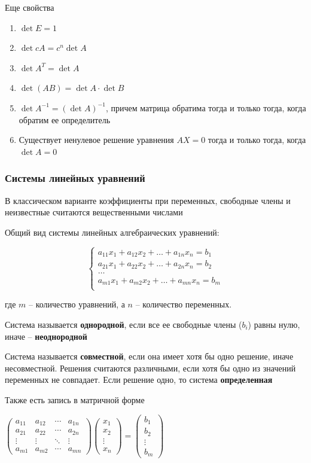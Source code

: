 \documentclass{article}
\begin{document}
Еще свойства

\begin{enumerate}
	\item $\det E = 1$
	\item $\det cA = c^n \det A$
	\item $\det A^T = \det A$
	\item $\det(AB) = \det A \cdot \det B$
	\item $\det A^{-1} = (\det A)^{-1}$, причем матрица обратима тогда и только тогда, когда обратим ее определитель
	\item Существует ненулевое решение уравнения $AX = 0$ тогда и только тогда, когда $\det A = 0$ 
\end{enumerate}

\subsubsection{Системы линейных уравнений}

В классическом варианте коэффициенты при переменных, свободные члены и неизвестные считаются вещественными числами

Общий вид системы линейных алгебраических уравнений:

$$
{\begin{cases}a_{11}x_{1}+a_{12}x_{2}+\dots +a_{1n}x_{n}=b_{1}\\a_{21}x_{1}+a_{22}x_{2}+\dots +a_{2n}x_{n}=b_{2}\\\dots \\a_{m1}x_{1}+a_{m2}x_{2}+\dots +a_{mn}x_{n}=b_{m}\\\end{cases}}$$

где $m$ -- количество уравнений, а $n$ -- количество переменных.

Система называется {\bf однородной}, если все ее свободные члены ($b_i$) равны нулю, иначе -- {\bf неоднородной}

Система называется {\bf совместной}, если она имеет хотя бы одно решение, иначе несовместной. Решения считаются различными, если хотя бы одно из значений переменных не совпадает. Если решение одно, то система {\bf определенная}

Также есть запись в матричной форме

$
\begin{pmatrix}
a_{11} & a_{12} & \cdots & a_{1n} \\
a_{21} & a_{22} & \cdots & a_{2n} \\
\vdots & \vdots & \ddots & \vdots \\
a_{m1} & a_{m2} & \cdots & a_{mn} 
\end{pmatrix}
\begin{pmatrix}
	x_1 \\
	x_2 \\
	\vdots \\
	x_n
\end{pmatrix} 
=
\begin{pmatrix}
	b_1 \\
	b_2 \\
	\vdots \\
	b_m
\end{pmatrix}$
\end{document}

